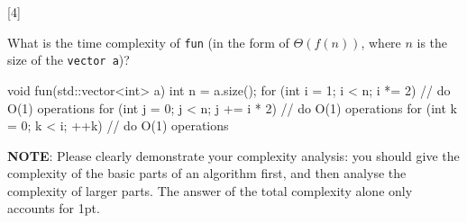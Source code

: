 [4]

What is the time complexity of \lstinline{fun} (in the form of \(\Theta(f(n))\), where \(n\) is the size of the \lstinline{vector a})?

\begin{cpp}
void fun(std::vector<int> a) {
    int n = a.size();
    for (int i = 1; i < n; i *= 2) {
        // do O(1) operations
        for (int j = 0; j < n; j += i * 2) {
            // do O(1) operations
            for (int k = 0; k < i; ++k) {
                // do O(1) operations
            }
        }
    }
}
\end{cpp}

\textbf{NOTE}: Please clearly demonstrate your complexity analysis: you should give the complexity of the basic parts of an algorithm first, and then analyse the complexity of larger parts. The answer of the total complexity alone only accounts for 1pt.

\begin{solution}
\vspace{4.6in}
\end{solution}